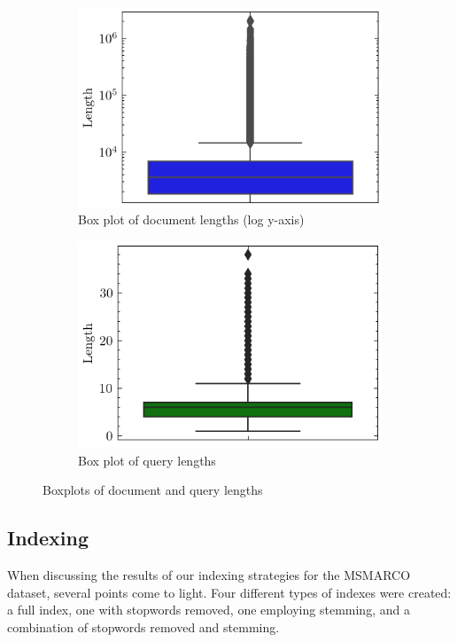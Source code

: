 \documentclass[11pt,a4paper]{article}
\begin{document}
\begin{figure}[ht!]
    \centering
    \begin{subfigure}[b]{0.45\textwidth}
        \includegraphics[width=\textwidth]{../media/doc_lengths_boxplot_log_y.png}
        \caption{Box plot of document lengths (log y-axis)}
    \end{subfigure} 
    \hfill
    \begin{subfigure}[b]{0.45\textwidth}
        \includegraphics[width=\textwidth]{../media/query_lengths_boxplot.png}
        \caption{Box plot of query lengths}
    \end{subfigure}
    \caption{Boxplots of document and query lengths}
\end{figure}

\newpage

\subsection{Indexing}
When discussing the results of our indexing strategies for the
MSMARCO dataset, several points come to light. Four different types
of indexes were created: a full index, one with stopwords removed,
one employing stemming, and a combination of stopwords removed and
stemming.
\end{document}
